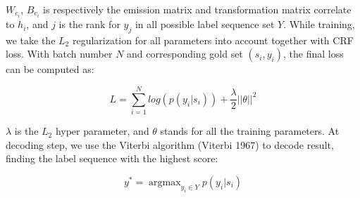 \documentclass[letterpaper]{article} %
\begin{document}
$W_{c_i}$, $B_{c_i}$ is respectively the emission matrix and transformation matrix correlate to $h_i$, and $j$ is the rank for $y_j$ in all possible label sequence set $Y$.  While training, we take the $L_2$ regularization for all parameters into account together with CRF loss. With batch number $N$ and corresponding gold set $(s_i, y_i)$, the final loss can be computed as:

\begin{equation}
L = \sum_{i=1}^{N}{log(p(y_i | s_i))} + \frac{\lambda}{2}{|| \theta ||}^2
\label{crf_probability}
\end{equation}

$\lambda$ is the $L_2$ hyper parameter, and $\theta$ stands for all the training parameters. At decoding step, we use the Viterbi algorithm (Viterbi 1967) to decode result, finding the label sequence with the highest score: 

\begin{equation}
y^* = \mathop{\arg\max}_{y_i \in Y}{p(y_i | s_i)}
\label{crf_decode}
\end{equation}

\begin{table}[t]
\caption{Statistics of Sogou MusicNER dataset.}\smallskip
\centering
{}
\label{table1}
\end{table}

\begin{table}[t]
\caption{Hyperparameters}\smallskip
\centering
{}
\label{table2}
\end{table}
\end{document}
